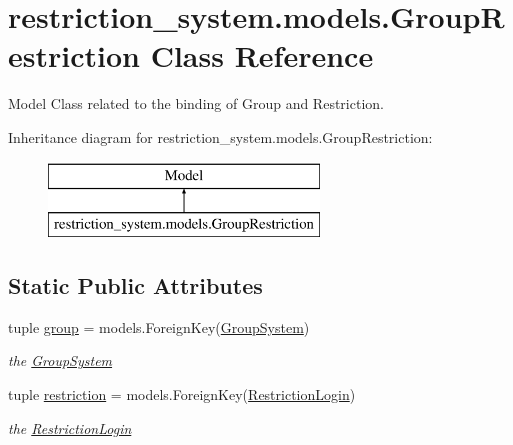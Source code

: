 \hypertarget{classrestriction__system_1_1models_1_1GroupRestriction}{}\section{restriction\+\_\+system.\+models.\+Group\+Restriction Class Reference}
\label{classrestriction__system_1_1models_1_1GroupRestriction}


Model Class related to the binding of Group and Restriction.  


Inheritance diagram for restriction\+\_\+system.\+models.\+Group\+Restriction\+:\begin{figure}[H]
\begin{center}
\leavevmode
\includegraphics[height=2.000000cm]{classrestriction__system_1_1models_1_1GroupRestriction}
\end{center}
\end{figure}
\subsection*{Static Public Attributes}
\begin{DoxyCompactItemize}
\item 
\hypertarget{classrestriction__system_1_1models_1_1GroupRestriction_a987dc8c4a34d0c28adb5391d917d498f}{}tuple \hyperlink{classrestriction__system_1_1models_1_1GroupRestriction_a987dc8c4a34d0c28adb5391d917d498f}{group} = models.\+Foreign\+Key(\hyperlink{classrestriction__system_1_1models_1_1GroupSystem}{Group\+System})\label{classrestriction__system_1_1models_1_1GroupRestriction_a987dc8c4a34d0c28adb5391d917d498f}

\begin{DoxyCompactList}\small\item\em the \hyperlink{classrestriction__system_1_1models_1_1GroupSystem}{Group\+System} \end{DoxyCompactList}\item 
\hypertarget{classrestriction__system_1_1models_1_1GroupRestriction_a1c8ef5b25c516d5d78c3c91373951e7f}{}tuple \hyperlink{classrestriction__system_1_1models_1_1GroupRestriction_a1c8ef5b25c516d5d78c3c91373951e7f}{restriction} = models.\+Foreign\+Key(\hyperlink{classrestriction__system_1_1models_1_1RestrictionLogin}{Restriction\+Login})\label{classrestriction__system_1_1models_1_1GroupRestriction_a1c8ef5b25c516d5d78c3c91373951e7f}

\begin{DoxyCompactList}\small\item\em the \hyperlink{classrestriction__system_1_1models_1_1RestrictionLogin}{Restriction\+Login} \end{DoxyCompactList}\end{DoxyCompactItemize}


